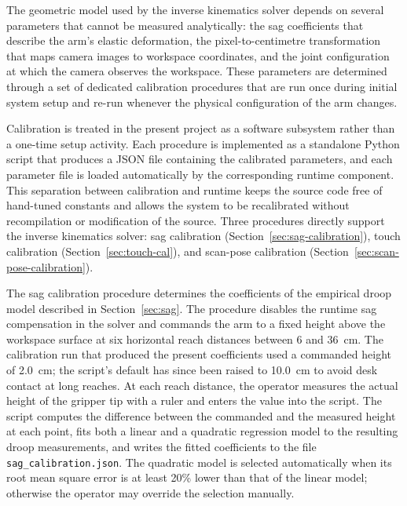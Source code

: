 \label{sec:calibration}

The geometric model used by the inverse kinematics solver depends on 
several parameters that cannot be measured analytically: the 
sag coefficients that describe the arm's elastic deformation, the 
pixel-to-centimetre transformation that maps camera images to 
workspace coordinates, and the joint configuration at which the 
camera observes the workspace. These parameters are determined 
through a set of dedicated calibration procedures that are run 
once during initial system setup and re-run whenever the physical 
configuration of the arm changes.

Calibration is treated in the present project as a software 
subsystem rather than a one-time setup activity. Each procedure 
is implemented as a standalone Python script that produces a JSON 
file containing the calibrated parameters, and each parameter file 
is loaded automatically by the corresponding runtime component. 
This separation between calibration and runtime keeps the source 
code free of hand-tuned constants and allows the system to be 
recalibrated without recompilation or modification of the source. 
Three procedures directly support the inverse kinematics solver: 
sag calibration (Section~\ref{sec:sag-calibration}), touch calibration 
(Section~\ref{sec:touch-cal}), and scan-pose calibration (Section~\ref{sec:scan-pose-calibration}).

\label{sec:sag-calibration}

The sag calibration procedure determines the coefficients of the 
empirical droop model described in Section~\ref{sec:sag}. The procedure 
disables the runtime sag compensation in the solver and commands 
the arm to a fixed height above the workspace surface at six 
horizontal reach distances between 6 and 36~cm. The calibration 
run that produced the present coefficients used a commanded 
height of 2.0~cm; the script's default has since been raised to 
10.0~cm to avoid desk contact at long reaches. At each reach 
distance, the operator measures the actual height of the gripper 
tip with a ruler and enters the value into the script. The 
script computes the difference between the commanded and the 
measured height at each point, fits both a linear and a 
quadratic regression model to the resulting droop measurements, 
and writes the fitted coefficients to the file 
\texttt{sag\_calibration.json}. The quadratic model is selected 
automatically when its root mean square error is at least 20\% 
lower than that of the linear model; otherwise the operator may 
override the selection manually.

